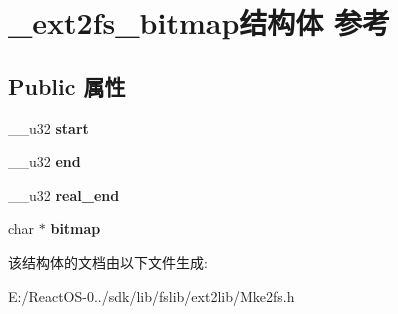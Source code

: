 \hypertarget{struct__ext2fs__bitmap}{}\section{\+\_\+ext2fs\+\_\+bitmap结构体 参考}
\label{struct__ext2fs__bitmap}
\subsection*{Public 属性}
\begin{DoxyCompactItemize}
\item 
\mbox{\label{struct__ext2fs__bitmap_ac5ac61a75d32c3ee7d95dfd9f9a2dbbc}} 
\+\_\+\+\_\+u32 {\bfseries start}
\item 
\mbox{\label{struct__ext2fs__bitmap_a55d6d9629efddad1d0349b1a831b0552}} 
\+\_\+\+\_\+u32 {\bfseries end}
\item 
\mbox{\label{struct__ext2fs__bitmap_a8d43f0f0656eb402a83e16c74a7747da}} 
\+\_\+\+\_\+u32 {\bfseries real\+\_\+end}
\item 
\mbox{\label{struct__ext2fs__bitmap_ae024f08a35c4ef4ec7ecb015ea156898}} 
char $\ast$ {\bfseries bitmap}
\end{DoxyCompactItemize}


该结构体的文档由以下文件生成\+:\begin{DoxyCompactItemize}
\item 
E\+:/\+React\+O\+S-\/0../sdk/lib/fslib/ext2lib/Mke2fs.\+h\end{DoxyCompactItemize}
